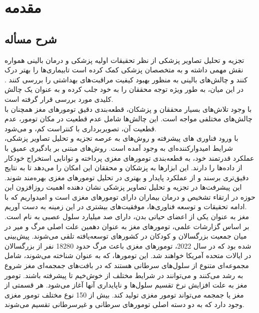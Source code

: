 
\chapter{مقدمه}
\thispagestyle{empty}
\section{شرح مسأله}
تجزیه و تحلیل تصاویر پزشکی از نظر تحقیقات اولیه پزشکی و درمان بالینی همواره نقش مهمی داشته و به متخصصان پزشکی کمک کرده است تابیماری‌ها را بهتر درک کنند و چالش‌های بالینی به منظور بهبود کیفیت مراقبت‌های بهداشتی را بررسی کنند . در این میان،  به طور ویژه توجه محققان را به خود جلب کرده و به عنوان یک چالش کلیدی مورد بررسی قرار گرفته است.
\\
با وجود تلاش‌های بسیار محققان و پزشکان، قطعه‌بندی دقیق تومورهای مغز همچنان با چالش‌های مختلفی مواجه است. این چالش‌ها شامل عدم قطعیت در مکان تومور، عدم قطعیت  آن، تصویربرداری با کنتراست کم،  و  می‌شود.
\\
با ورود فناوری های پیشرفته و روش‌های  به عرصه تجزیه و تحلیل تصاویر پزشکی، شرایط امیدوارکننده‌ای به وجود آمده است. روش‌های مبتنی بر یادگیری عمیق با عملکرد قدرتمند خود، به قطعه‌بندی تومورهای مغزی پرداخته و توانایی استخراج خودکار  از داده‌ها را دارند. این ابزارها به پزشکان و محققان این امکان را می‌دهد تا به نتایج دقیق‌تری برسند و از عملکرد پایدار و بهتری در تحلیل تومورهای مغزی بهره‌مند شوند. این پیشرفت‌ها در تجزیه و تحلیل تصاویر پزشکی نشان دهنده اهمیت روزافزون این حوزه در ارتقاء تشخیص و درمان بیماران دارای تومورهای مغزی است و امیدواریم که با ادامه تحقیقات و توسعه فناوری‌ها، موفقیت‌های بیشتری در این زمینه به دست آوریم.
\\
مغز به عنوان یکی از اعضای حیاتی بدن، دارای صد میلیارد سلول عصبی به نام  است. بر اساس گزارشات علمی، تومورهای مغز به عنوان دهمین علت اصلی مرگ و میر در میان جمعیت بزرگسالان و کودکان در کشورهای توسعه‌یافته تلقی می‌شوند. پیش‌بینی شده بود که در سال 2022، تومورهای مغزی باعث مرگ حدود 18280 نفر از بزرگسالان در ایالات متحده آمریکا خواهند شد. این تومورها، که به عنوان  شناخته می‌شوند، شامل مجموعه‌ای متنوع از سلول‌های سرطانی هستند که در بافت‌های جمجمه‌ای مغز شروع به رشد می‌کنند و می‌توانند در شرایط مختلف از خوش‌خیم تا پیشرفته باشند. تومور مغز به علت افزایش نرخ تقسیم سلول‌ها و ناپایداری آنها آغاز می‌شود. هر قسمتی از مغز یا جمجمه می‌تواند تومور مغزی تولید کند. بیش از 150 نوع مختلف تومور مغزی وجود دارد که به دو دسته اصلی تومورهای سرطانی و غیرسرطانی تقسیم می‌شوند\cite{ranjbarzadeh}.

